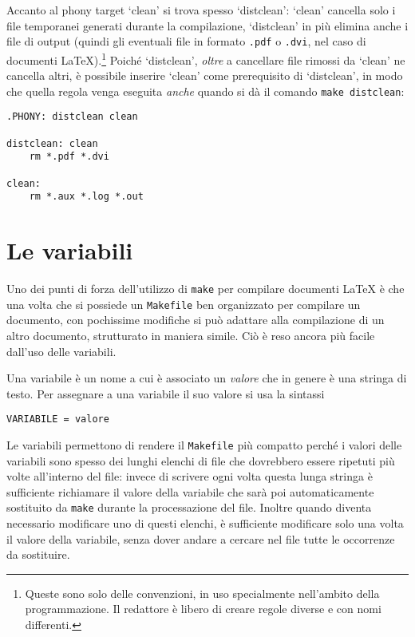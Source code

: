 Accanto al phony target `clean' si trova spesso `distclean': `clean' cancella
solo i file temporanei generati durante la compilazione, `distclean' in più
elimina anche i file di output (quindi gli eventuali file in formato \verb|.pdf|
o \verb|.dvi|, nel caso di documenti
\LaTeX).\footnote{Queste sono solo delle convenzioni, in uso specialmente
  nell'ambito della programmazione. Il redattore è libero di creare regole
  diverse e con nomi differenti.}
Poiché `distclean', \emph{oltre} a cancellare file rimossi da `clean' ne
cancella altri, è possibile inserire `clean' come prerequisito di `distclean',
in modo che quella regola venga eseguita \emph{anche} quando si dà il comando
\verb|make distclean|:
\begin{lstlisting}[caption={Phony target `distclean' e `clean'},label=lst:distclean]
.PHONY: distclean clean

distclean: clean
	rm *.pdf *.dvi

clean:
	rm *.aux *.log *.out
\end{lstlisting}


\section{Le variabili}
\label{sec:variabili}

Uno dei punti di forza dell'utilizzo di \verb|make| per compilare documenti
\LaTeX{}
è che una volta che si possiede un \verb|Makefile| ben organizzato per compilare
un documento, con pochissime modifiche si può adattare alla compilazione di un
altro documento, strutturato in maniera simile.  Ciò è reso ancora più facile
dall'uso delle variabili.

Una variabile è un nome a cui è associato un \emph{valore} che in genere è una
stringa di testo.  Per assegnare a una variabile il suo valore si usa la
sintassi
\begin{lstlisting}
VARIABILE = valore
\end{lstlisting}
Le variabili permettono di rendere il \verb|Makefile| più compatto perché i
valori delle variabili sono spesso dei lunghi elenchi di file che dovrebbero
essere ripetuti più volte all'interno del file: invece di scrivere ogni volta
questa lunga stringa è sufficiente richiamare il valore della variabile che sarà
poi automaticamente sostituito da \verb|make| durante la processazione del file.
Inoltre quando diventa necessario modificare uno di questi elenchi, è
sufficiente modificare solo una volta il valore della variabile, senza dover
andare a cercare nel file tutte le occorrenze da sostituire.

